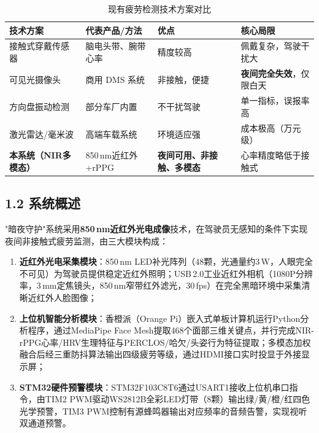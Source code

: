 \documentclass[a4paper,12pt]{article}
\begin{document}
\begin{table}[H]
  \centering
  \caption{现有疲劳检测技术方案对比}
  \label{tab:compare_existing}
  \renewcommand{\arraystretch}{1.3}
  \begin{tabular}{|p{3.2cm}|p{3.5cm}|p{3.5cm}|p{3.5cm}|}
    \hline
    \textbf{技术方案} & \textbf{代表产品/方法} & \textbf{优点} & \textbf{核心局限}\\
    \hline
    接触式穿戴传感器 & 脑电头带、腕带心率 & 精度较高 & 佩戴复杂，驾驶干扰大\\
    \hline
    可见光摄像头 & 商用 DMS 系统 & 非接触，便捷 & \textbf{夜间完全失效}，仅限白天\\
    \hline
    方向盘振动检测 & 部分车厂内置 & 不干扰驾驶 & 单一指标，误报率高\\
    \hline
    激光雷达/毫米波 & 高端车载系统 & 环境适应强 & 成本极高（万元级）\\
    \hline
    \rowcolor{lightgreen}
    \textbf{本系统（NIR多模态）} & 850\,nm近红外+rPPG & \textbf{夜间可用、非接触、多模态} & 心率精度略低于接触式\\
    \hline
  \end{tabular}
\end{table}

\subsection*{1.2 系统概述}

"暗夜守护"系统采用\textbf{850\,nm近红外光电成像}技术，在驾驶员无感知的条件下实现夜间非接触式疲劳监测，由三大模块构成：

\begin{enumerate}[leftmargin=2em, itemsep=3pt]
  \item \textbf{近红外光电采集模块}：850\,nm LED补光阵列（48颗，光通量约3\,W，人眼完全不可见）为驾驶员提供稳定近红外照明；USB\,2.0工业近红外相机（1080P分辨率，3\,mm定焦镜头，850\,nm窄带红外滤光，30\,fps）在完全黑暗环境中采集清晰近红外人脸图像；
  \item \textbf{上位机智能分析模块}：香橙派（Orange Pi）嵌入式单板计算机运行Python分析程序，通过MediaPipe Face Mesh提取468个面部三维关键点，并行完成NIR-rPPG心率/HRV生理特征与PERCLOS/哈欠/头姿行为特征提取；多模态加权融合后经三重防抖算法输出四级疲劳等级，通过HDMI接口实时投显于外接显示屏；
  \item \textbf{STM32硬件预警模块}：STM32F103C8T6通过USART1接收上位机串口指令，由TIM2 PWM驱动WS2812B全彩LED灯带（8颗）输出绿/黄/橙/红四色光学预警，TIM3 PWM控制有源蜂鸣器输出对应频率的音频告警，实现视听双通道预警。
\end{enumerate}
\end{document}
